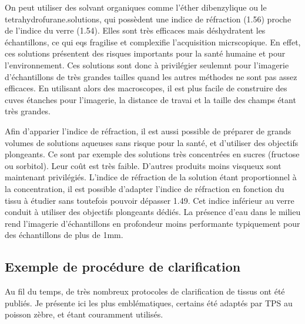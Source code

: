 \documentclass[\main/main.tex]{subfiles}
\begin{document}
%
On peut utiliser des solvant organiques comme l'éther dibenzylique ou le tetrahydrofurane.solutions, qui possèdent une indice de réfraction (1.56) proche de l'indice du verre (1.54).
%
Elles sont très efficaces mais déshydratent les échantillons, ce qui eqs fragilise et complexifie l'acquisition micrscopique. En effet, ces solutions présentent des risques importants pour la santé humaine et pour l'environnement.
%
Ces solutions sont donc à privilégier seulemnt pour l'imagerie d'échantillons de très grandes tailles quand les autres méthodes ne sont pas assez efficaces. En utilisant alors des macroscopes, il est plus facile de construire des cuves étanches pour l'imagerie, la distance de travai et la taille des champs étant très grandes. 

%
Afin d'apparier l'indice de réfraction, il est aussi possible de préparer de grands volumes de solutions aqueuses sans risque pour la santé, et d'utiliser des objectifs plongeants. Ce sont par exemple des solutions très concentrées en sucres (fructose ou sorbitol). Leur coût est très faible. D'autres produits moins visqueux sont maintenant privilégiés.
%
L'indice de réfraction de la solution étant proportionnel à la concentration, il est possible d'adapter l'indice de réfraction en fonction du tissu à étudier  sans toutefois pouvoir dépasser 1.49. Cet indice inférieur au verre conduit à utiliser des objectifs plongeants dédiés. La présence d'eau dans le milieu rend l'imagerie d'échantillons en profondeur moins performante typiquement pour des échantillons de plus de 1mm.

\subsection{Exemple de procédure de clarification}

%
Au fil du temps, de très nombreux protocoles de clarification de tissus ont été publiés. Je présente ici les plus emblématiques, certains été adaptés par TPS au poisson zèbre, et étant couramment utilisés.
%

\end{document}
